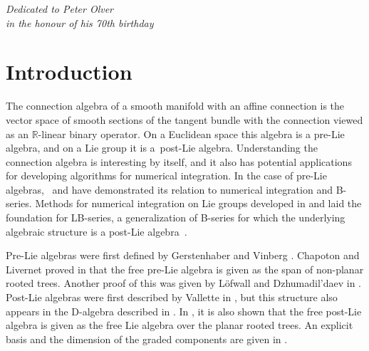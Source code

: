 \documentclass[pdftex]{sigma}
\numberwithin{equation}{section}
\begin{document}


\begin{flushright}
\begin{minipage}{55mm}
\it Dedicated to Peter Olver\\
 in the honour of his 70th birthday
 \end{minipage}
 \end{flushright}

\renewcommand{\thefootnote}{\arabic{footnote}}
\setcounter{footnote}{0}

\section{Introduction}

The connection algebra of a smooth manifold with an affine connection is the vector space of smooth sections of the tangent bundle with the connection viewed as an $\mathbb{R}$-linear binary operator. On a Euclidean space this algebra is a pre-Lie algebra, and on a Lie group it is a~post-Lie algebra. Understanding the connection algebra is interesting by itself, and it also has potential applications for developing algorithms for numerical integration. In the case of pre-Lie algebras,~\cite{B-series_CHV_2010} and \cite{CALAQUE_2011} have demonstrated its relation to numerical integration and B-series. Methods for numerical integration on Lie groups developed in \cite{MK_1995_LB} and \cite{iserles2000lie} laid the foundation for LB-series, a generalization of B-series for which the underlying algebraic structure is a post-Lie algebra~\cite{CEFMK19, KMKL_15}.

Pre-Lie algebras were first defined by Gerstenhaber \cite{Gerstenhaber_63} and Vinberg \cite{Vinberg}. Chapoton and Livernet proved in \cite{Chapoton_and_Livernet_01} that the free pre-Lie algebra is given as the span of non-planar rooted trees. Another proof of this was given by L\"{o}fwall and Dzhumadil'daev in \cite{Dzhumadildeav_and_Lofwall_02}. Post-Lie algebras were first described by Vallette in \cite{BV_2007}, but this structure also appears in the D-algebra described in \cite{MK_Wright_08}. In \cite{MK_Lundervold_2013, BV_2007}, it is also shown that the free post-Lie algebra is given as the free Lie algebra over the planar rooted trees. An explicit basis and the dimension of the graded components are given in \cite{MKK_03}.
\end{document}
